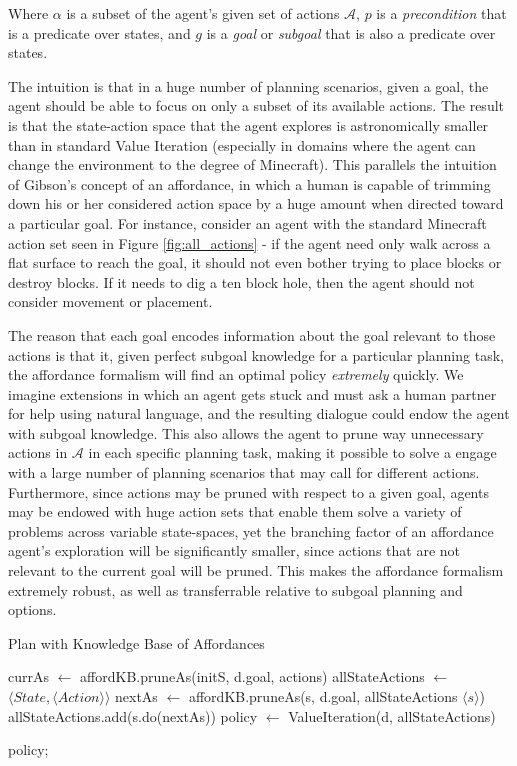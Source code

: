 \documentclass[]{article}
\begin{document}
Where $\alpha$ is a subset of the agent's given set of actions 
$\mathcal{A}$, $p$ is a {\it precondition} that is a predicate over states, 
and $g$ is a {\it goal} or {\it subgoal} that is also a predicate over states.

The intuition is that in a huge number of planning scenarios, given a goal, the agent 
should be able to focus on only a subset of its available actions. The result is that the 
state-action space that the agent explores is astronomically smaller than in standard 
Value Iteration (especially in domains where the agent can change the environment 
to the degree of Minecraft). This parallels the intuition of Gibson's concept of an 
affordance, in which a human is capable of trimming down his or her considered 
action space by a huge amount when directed toward a particular goal. For instance, 
consider an agent with the standard Minecraft action set seen in Figure \ref{fig:all_actions} - 
if the agent need only walk across a flat surface to reach the goal, it should not 
even bother trying to place blocks or destroy blocks. If it needs to dig a ten block 
hole, then the agent should not consider movement or placement.

The reason that each goal encodes information about the goal relevant to 
those actions is that it, given perfect subgoal knowledge for a particular 
planning task, the affordance formalism will find an optimal policy {\it extremely}
 quickly. We imagine extensions in which an agent gets stuck and must ask 
 a human partner for help using natural language, and the resulting dialogue 
 could endow the agent with subgoal knowledge. This also allows the agent 
 to prune way unnecessary actions in $\mathcal{A}$ in each specific planning 
 task, making it possible to solve a engage with a large number of planning 
 scenarios that may call for different actions. Furthermore, since actions may 
 be pruned with respect to a given goal, agents may be endowed with huge 
 action sets that enable them solve a variety of problems across variable 
 state-spaces, yet the branching factor of an affordance agent's exploration 
 will be significantly smaller, since actions that are not relevant to the current 
 goal will be pruned. This makes the affordance formalism extremely robust, 
 as well as transferrable relative to subgoal planning and options.


\begin{algorithm}
  \caption{Plan with Knowledge Base of Affordances}

  \begin{algorithmic}
    \State {}
    \State currAs $\gets$ affordKB.pruneAs(initS, d.goal, actions)
    \State allStateActions $\gets$ $\langle State ,\langle Action \rangle \rangle$
	\State nextAs $\gets$ affordKB.pruneAs(s, d.goal, allStateActions $\langle s \rangle$)
	\State allStateActions.add(s.do(nextAs))
    \EndFor
    \State {}
    \State policy $\gets$ ValueIteration(d, allStateActions)
    
    \Return policy;
  \end{algorithmic}
\end{algorithm}
\end{document}
